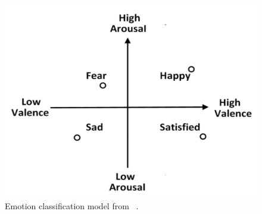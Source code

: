 \begin{figure}
    \centering
    \includegraphics[scale=0.45]{images/emotion-classification.png}
    \caption{Emotion classification model from ~\cite{emotion_classification}.}
    \label{fig:emotion_classification}
\end{figure}
